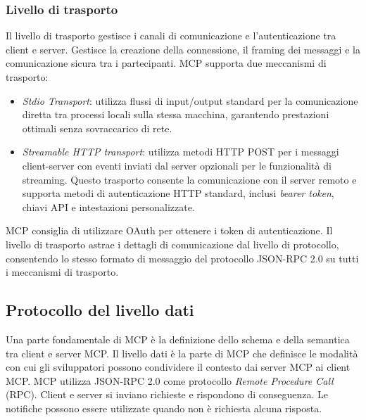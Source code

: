 \subsubsection{Livello di trasporto}
Il livello di trasporto gestisce i canali di comunicazione e l'autenticazione tra client e server. Gestisce la creazione della connessione, il framing dei messaggi e la comunicazione sicura tra i partecipanti.
MCP supporta due meccanismi di trasporto:
\begin{itemize}
\item \textit{Stdio Transport}: utilizza flussi di input/output standard per la comunicazione diretta tra processi locali sulla stessa macchina, garantendo prestazioni ottimali senza sovraccarico di rete.
\item \textit{Streamable HTTP transport}: utilizza metodi HTTP POST per i messaggi client-server con eventi inviati dal server opzionali per le funzionalità di streaming. Questo trasporto consente la comunicazione con il server remoto e supporta metodi di autenticazione HTTP standard, inclusi \textit{bearer token}, chiavi API e intestazioni personalizzate.
\end{itemize}
MCP consiglia di utilizzare OAuth per ottenere i token di autenticazione.
Il livello di trasporto astrae i dettagli di comunicazione dal livello di protocollo, consentendo lo stesso formato di messaggio del protocollo JSON-RPC 2.0 su tutti i meccanismi di trasporto.
\cite{modelcontextprotocol2024arch}

\subsection{Protocollo del livello dati}
Una parte fondamentale di MCP è la definizione dello schema e della semantica tra client e server MCP. Il livello dati è la parte di MCP che definisce le modalità con cui gli sviluppatori possono condividere il contesto dai server MCP ai client MCP.
MCP utilizza JSON-RPC 2.0 come protocollo \textit{Remote Procedure Call} (RPC). Client e server si inviano richieste e rispondono di conseguenza. Le notifiche possono essere utilizzate quando non è richiesta alcuna risposta.
\cite{modelcontextprotocol2024arch}

